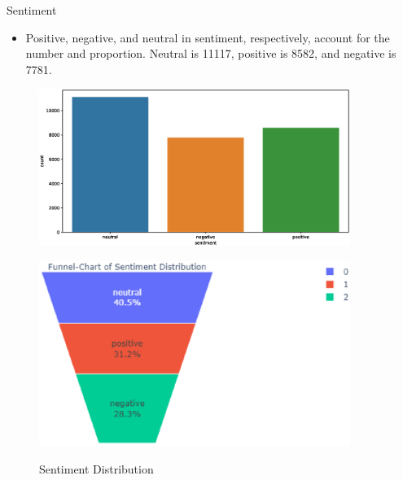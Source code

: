 \documentclass[
 size=14pt,
 paper=smartboard,  %
 mode=present, 		%
 display=slides, 	%
 style=tuliplab,  	%
 pauseslide,
 fleqn,leqno]{powerdot}
\begin{document}
\begin{slide}{Sentiment}
  \begin{itemize}
    \item Positive, negative, and neutral in sentiment, respectively, 
    account for the number and proportion. Neutral is 11117, positive is 8582, and negative is 7781.
  \end{itemize}
  \begin{figure}[htbp]
    \centering
    \begin{minipage}[t]{0.48\textwidth}
      \centering
      \includegraphics[width=0.9\textwidth]{figures//sentiment.eps}\\
      \vspace{-1.4em}
      \caption{Sentiment}
    \end{minipage}
    \begin{minipage}[t]{0.48\textwidth}
      \centering
      \includegraphics[width=0.9\textwidth]{figures//snetimentdistruct.eps}\\
      \vspace{-1.4em}
      \caption{Sentiment Distribution}
    \end{minipage}
  \end{figure}
\end{slide}
\end{document}
